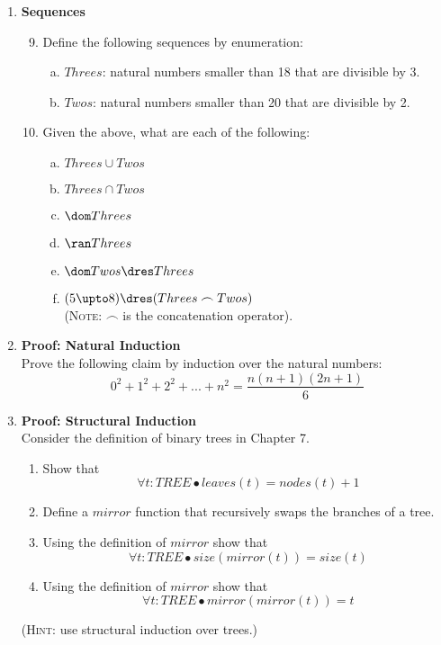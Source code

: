 \documentclass{article}
\begin{document}
\begin{enumerate}[\bf I.]
\begin{enumerate}[1.]
\end{enumerate}

\item \textbf{Sequences}


\begin{enumerate}[1.]\setcounter{enumii}{8}

\item Define the following sequences by enumeration:
\begin{enumerate}[a.]
\item $Threes$: natural numbers smaller than 18 that are divisible by 3.
\item  $Twos$: natural numbers smaller than 20 that are divisible by 2.
\end{enumerate}

\item Given the above, what are each of the following:
\begin{enumerate}[a.]
\item $Threes \cup Twos$
\item $Threes \cap Twos$
\item $\dom Threes$
\item $\ran Threes$
\item $\dom Twos \dres Threes$
\item $(5 \upto 8)\dres (Threes \frown Twos)$\\
(\textsc{Note}: $\frown$ is the concatenation operator).
\end{enumerate}
\end{enumerate}


\item \textbf{Proof: Natural Induction} \\[8pt]
Prove the following claim by induction over the natural numbers:
\[\displaystyle 0^2 + 1^2 + 2^2 + ... + n^2 = \frac{n( n + 1 )( 2n + 1 )}{6}\]

\item \textbf{Proof: Structural Induction} \\[8pt]
Consider the definition of binary trees in Chapter 7.
\begin{enumerate}
\item Show that
\[\forall t: TREE \bullet leaves(t) = nodes(t) + 1\]
\item Define a $mirror$ function that recursively swaps the branches of a tree.
\item Using the definition of $mirror$  show
that
\[\forall t: TREE \bullet size(mirror(t)) = size(t)\]
\item Using the definition of $mirror$ show that
\[\forall t: TREE \bullet mirror(mirror(t)) = t\]
\end{enumerate}
(\textsc{Hint}: use structural induction over trees.)


\end{enumerate}
\end{document}
